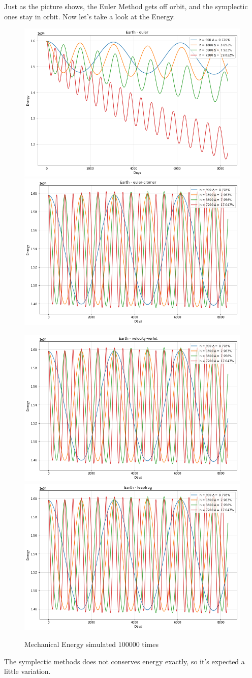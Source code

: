 \documentclass[12pt]{article}
\begin{document}
Just as the picture shows, the Euler Method gets off orbit, and the symplectic ones stay in orbit.
Now let's take a look at the Energy.
\begin{figure}[H]
  \includegraphics[width=.5\textwidth, height =.4\textheight]{earth-en-euler.png}
  \includegraphics[width=.5\textwidth, height =.4\textheight]{earth-en-eulercromer.png}

  \includegraphics[width=.5\textwidth, height =.4\textheight]{earth-en-verlet.png}
  \includegraphics[width=.5\textwidth, height =.4\textheight]{earth-en-leapfrog.png}
  \caption{Mechanical Energy simulated \(100000\) times}
  \label{Euler Method}
\end{figure}
The symplectic methods does not conserves energy exactly, so it's expected a little variation.\\
\end{document}
